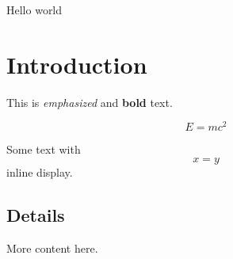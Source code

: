 \documentclass{article}
\begin{document}
Hello world

\section{Introduction}
This is \emph{emphasized} and \textbf{bold} text.

\[
E = mc^2
\]

Some text with \[ x = y \] inline display.

\vspace{1cm}
\medskip

\subsection{Details}
More content here.
\end{document}
